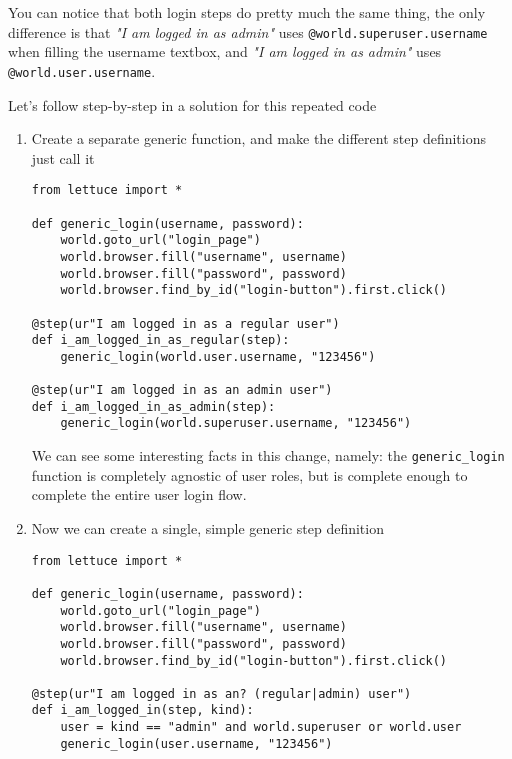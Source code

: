 \documentclass[letterpaper]{article}
\begin{document}
\noindent
You can notice that both login steps do pretty much the same thing,
the only difference is that \textit{"I am logged in as admin"} uses
\texttt{@world.superuser.username} when filling the username textbox,
and \textit{"I am logged in as admin"} uses
\texttt{@world.user.username}.

\noindent
Let's follow step-by-step in a solution for this repeated code

\begin{enumerate}
\item{Create a separate generic function, and make the different step definitions just call it}

\footnotesize
\begin{verbatim}
from lettuce import *

def generic_login(username, password):
    world.goto_url("login_page")
    world.browser.fill("username", username)
    world.browser.fill("password", password)
    world.browser.find_by_id("login-button").first.click()

@step(ur"I am logged in as a regular user")
def i_am_logged_in_as_regular(step):
    generic_login(world.user.username, "123456")

@step(ur"I am logged in as an admin user")
def i_am_logged_in_as_admin(step):
    generic_login(world.superuser.username, "123456")
\end{verbatim}
\normalsize

We can see some interesting facts in this change, namely: the
\texttt{generic\_login} function is completely agnostic of user roles,
but is complete enough to complete the entire user login flow.


\item{Now we can create a single, simple generic step definition}

\footnotesize
\begin{verbatim}
from lettuce import *

def generic_login(username, password):
    world.goto_url("login_page")
    world.browser.fill("username", username)
    world.browser.fill("password", password)
    world.browser.find_by_id("login-button").first.click()

@step(ur"I am logged in as an? (regular|admin) user")
def i_am_logged_in(step, kind):
    user = kind == "admin" and world.superuser or world.user
    generic_login(user.username, "123456")

\end{verbatim}
\normalsize


\end{enumerate}
\end{document}
